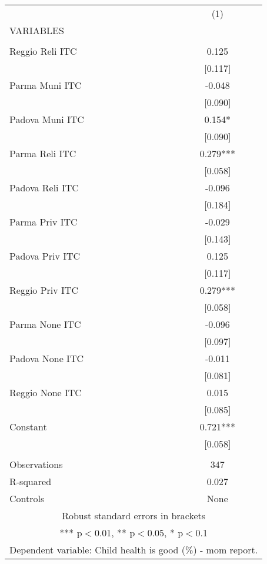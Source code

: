 \begin{tabular}{lc} \hline
 & (1) \\
VARIABLES &  \\ \hline
 &  \\
Reggio Reli ITC & 0.125 \\
 & [0.117] \\
Parma Muni ITC & -0.048 \\
 & [0.090] \\
Padova Muni ITC & 0.154* \\
 & [0.090] \\
Parma Reli ITC & 0.279*** \\
 & [0.058] \\
Padova Reli ITC & -0.096 \\
 & [0.184] \\
Parma Priv ITC & -0.029 \\
 & [0.143] \\
Padova Priv ITC & 0.125 \\
 & [0.117] \\
Reggio Priv ITC & 0.279*** \\
 & [0.058] \\
Parma None ITC & -0.096 \\
 & [0.097] \\
Padova None ITC & -0.011 \\
 & [0.081] \\
Reggio None ITC & 0.015 \\
 & [0.085] \\
Constant & 0.721*** \\
 & [0.058] \\
 &  \\
Observations & 347 \\
R-squared & 0.027 \\
 Controls & None \\ \hline
\multicolumn{2}{c}{ Robust standard errors in brackets} \\
\multicolumn{2}{c}{ *** p$<$0.01, ** p$<$0.05, * p$<$0.1} \\
\multicolumn{2}{c}{ Dependent variable: Child health is good (\%) - mom report.} \\
\end{tabular}
